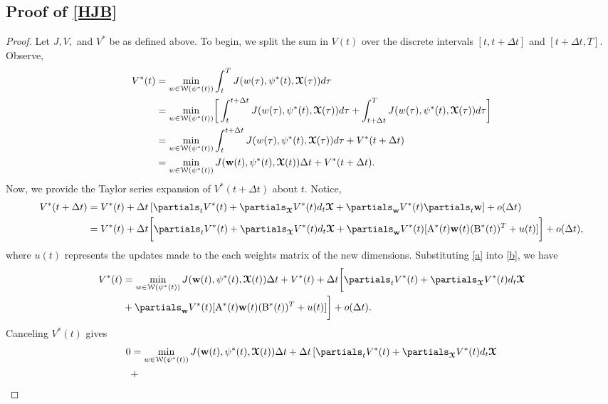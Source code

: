 \subsection{Proof of \cref{HJB}}\label{sec:HJB}
\begin{proof}
    Let $J, V,$ and $V^*$ be as defined above. To begin, we split the sum in $V(t)$ over the discrete intervals $[t,t+\Delta t]$ and $[t+\Delta t, T].$ Observe,
    \begin{align}\label{b}
        V^*(t) & = \min_{w\in \mathcal{W}(\psi^*(t))} \int_{t}^T J(w(\tau),\psi^*(t), \boldsymbol{\mathcal{X}}(\tau))d\tau\nonumber\\
                & = \min_{w\in \mathcal{W}(\psi^*(t))} \biggr[\int_{t}^{t+\Delta t} J(w(\tau),\psi^*(t), \boldsymbol{\mathcal{X}}(\tau))d\tau+ \int_{t+\Delta t}^{T} J(w(\tau),\psi^*(t), \boldsymbol{\mathcal{X}}(\tau))d\tau\biggr]\nonumber\\
                & = \min_{w\in \mathcal{W}(\psi^*(t))} \int_{t}^{t+\Delta t} J(w(\tau),\psi^*(t),\boldsymbol{\mathcal{X}}(\tau))d\tau + V^*(t+\Delta t)\nonumber\\
                & = \min_{w\in \mathcal{W}(\psi^*(t))} J(\boldsymbol{\mathrm{w}}(t),\psi^*(t),\boldsymbol{\mathcal{X}}(t))\Delta t + V^*(t+\Delta t).
    \end{align}
    Now, we provide the Taylor series expansion of $V^*(t+\Delta t)$ about $t.$ Notice,
    \begin{align}
        V^*(t+\Delta t) & = V^*(t) + \Delta t \left[\partials_{t}V^*(t)  + \partials_{\tx}V^*(t) d_{t} \tx + \partials_{\weight}V^*(t)  \partials_t \weight \right] + o(\Delta t)\nonumber\\
                & = V^*(t) + \Delta t\biggr[\partials_{t} V^*(t)  + \partials_{\tx}V^*(t) d_{t} \tx + \partials_{\weight}V^*(t) [\mathrm{A}^*(t)\weight(t)( \mathrm{B}^*(t))^T + u(t)]\biggr] + o(\Delta t),\label{a}
    \end{align}
    where $u(t)$ represents the updates made to the each weights matrix of the new dimensions.
    Substituting \eqref{a} into \eqref{b}, we have
    \begin{align*}
        V^*(t) & = \min_{w\in \mathcal{W}(\psi^*(t))} J(\weight(t),\psi^*(t),\tx(t))\Delta t+ V^*(t) + \Delta t\biggr[\partials_{t} V^*(t)  + \partials_{\tx}V^*(t) d_{t} \tx\\ 
                &+ \partials_{\weight}V^*(t) [\mathrm{A}^*(t)\weight(t)( \mathrm{B}^*(t))^T + u(t)]\biggr] + o(\Delta t).
    \end{align*}
    Canceling $V^*(t)$ gives
    \begin{align*}
        0 & = \min_{w\in \mathcal{W}(\psi^*(t))} J(\weight(t),\psi^*(t),\tx(t))\Delta t+ \Delta t\left[\partials_{t}V^*(t)  + \partials_{\tx}V^*(t) d_{t} \tx \right.  \\ &+

\end{align*}
\end{proof}

